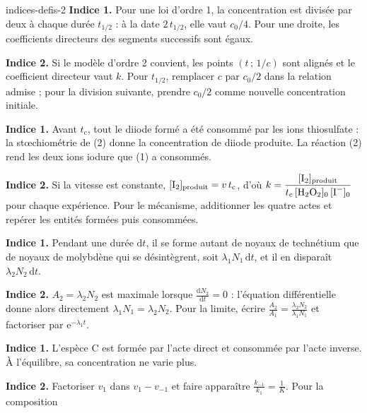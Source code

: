 \begin{blocEdition}{indices-defis-2}
\textbf{Indice 1.} Pour une loi d'ordre 1, la concentration est divisée par deux à chaque durée $t_{1/2}$ : à la date
$2\,t_{1/2}$, elle vaut $c_0/4$. Pour une droite, les coefficients directeurs des segments successifs sont égaux.\par\smallskip
\textbf{Indice 2.} Si le modèle d'ordre 2 convient, les points $(t\,;\,1/c)$ sont alignés et le coefficient directeur
vaut $k$. Pour $t_{1/2}$, remplacer $c$ par $c_0/2$ dans la relation admise ; pour la division suivante, prendre
$c_0/2$ comme nouvelle concentration initiale.\par\smallskip
{}
\textbf{Indice 1.} Avant $t_\mathrm{c}$, tout le diiode formé a été consommé par les ions thiosulfate : la
stœchiométrie de (2) donne la concentration de diiode produite. La réaction (2) rend les deux ions iodure que (1) a
consommés.\par\smallskip
\textbf{Indice 2.} Si la vitesse est constante, $[\ce{I2}]_\text{produit}=v\,t_\mathrm{c}$, d'où
$k=\dfrac{[\ce{I2}]_\text{produit}}{t_\mathrm{c}\,[\ce{H2O2}]_0\,[\ce{I-}]_0}$ pour chaque expérience. Pour le
mécanisme, additionner les quatre actes et repérer les entités formées puis consommées.\par\smallskip
{}
\textbf{Indice 1.} Pendant une durée $\mathrm{d}t$, il se forme autant de noyaux de technétium que de noyaux de
molybdène qui se désintègrent, soit $\lambda_1N_1\,\mathrm{d}t$, et il en disparaît $\lambda_2N_2\,\mathrm{d}t$.\par\smallskip
\textbf{Indice 2.} $A_2=\lambda_2N_2$ est maximale lorsque $\frac{\mathrm{d}N_2}{\mathrm{d}t}=0$ : l'équation
différentielle donne alors directement $\lambda_1N_1=\lambda_2N_2$. Pour la limite, écrire $\frac{A_2}{A_1}=\frac{\lambda_2N_2}{\lambda_1N_1}$
et factoriser par $\mathrm{e}^{-\lambda_1t}$.\par\smallskip
{}
\textbf{Indice 1.} L'espèce C est formée par l'acte direct et consommée par l'acte inverse. À l'équilibre, sa
concentration ne varie plus.\par\smallskip
\textbf{Indice 2.} Factoriser $v_1$ dans $v_1-v_{-1}$ et faire apparaître $\frac{k_{-1}}{k_1}=\frac1K$. Pour la composition

\end{blocEdition}

